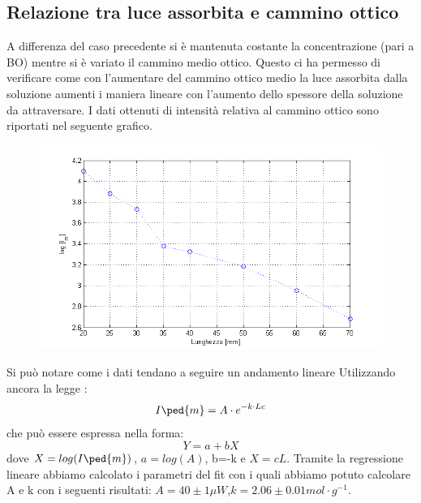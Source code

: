 \documentclass[a4paper,11pt]{article}
\begin{document}
\subsection{Relazione tra luce assorbita e cammino ottico}
A differenza del caso precedente si è mantenuta costante la concentrazione (pari a BO) mentre si è variato il cammino medio ottico.
Questo ci ha permesso di verificare come con l'aumentare del cammino ottico medio la luce assorbita dalla soluzione aumenti i maniera lineare con l'aumento dello spessore della soluzione da attraversare.
I dati ottenuti di intensità relativa al cammino ottico sono riportati nel seguente grafico.
\vspace{2000 pt}
 \begin{center} 
\begin{figure}[htpd]
\hspace{0 pt}
\includegraphics[scale=0.80]{grafico2.png}
\end{figure}
\end{center}
Si può notare come i dati tendano a seguire un andamento lineare
Utilizzando ancora la legge : $$I\ped{m}=A\cdot e^{-k\cdot Lc}$$
che può essere espressa nella forma: $$Y=a+bX$$ dove $X=log(I\ped{m})$, $a=log(A)$, b=-k e $X=cL$. 
Tramite la regressione lineare abbiamo calcolato i parametri del fit con i quali abbiamo potuto calcolare A e k con i seguenti risultati:
 $A = 40  \pm 1 \mu W $,$k = 2.06 \pm 0.01 mol\cdot g^{-1}$.
 
\end{document}
